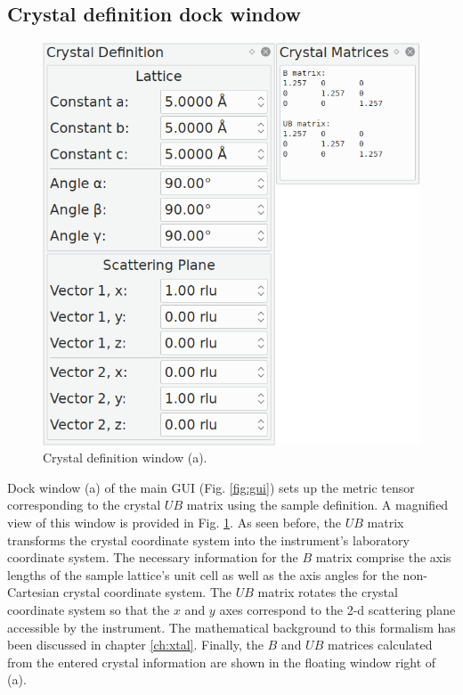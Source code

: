 \subsection{Crystal definition dock window}
\label{sec:gui_xtal}
\begin{minipage}{1 \textwidth}
\setlength{\intextsep}{0.25cm}
\begin{figure}
	\vspace{-0.25cm}
	\includegraphics[width = 0.45 \textwidth]{figures/gui_xtal}
	\caption[Crystal definition window]{Crystal definition window (a).
		\label{fig:gui_xtal}}
\end{figure}

Dock window (a) of the main GUI (Fig. \ref{fig:gui}) sets up the metric tensor corresponding 
to the crystal $UB$ matrix using the sample definition.
A magnified view of this window is provided in Fig. \ref{fig:gui_xtal}. 
As seen before, the $UB$ matrix transforms the crystal coordinate system into the instrument's 
laboratory coordinate system.
The necessary information for the $B$ matrix comprise the axis lengths of the sample lattice's
unit cell as well as the axis angles for the non-Cartesian crystal coordinate system.
The $UB$ matrix rotates the crystal coordinate system so that the $x$ and $y$ axes correspond
to the 2-d scattering plane accessible by the instrument.
The mathematical background to this formalism has been discussed in chapter \ref{ch:xtal}.
Finally, the $B$ and $UB$ matrices calculated from the entered crystal information are shown 
in the floating window right of (a).
\end{minipage}
\vspace{0.5cm}



